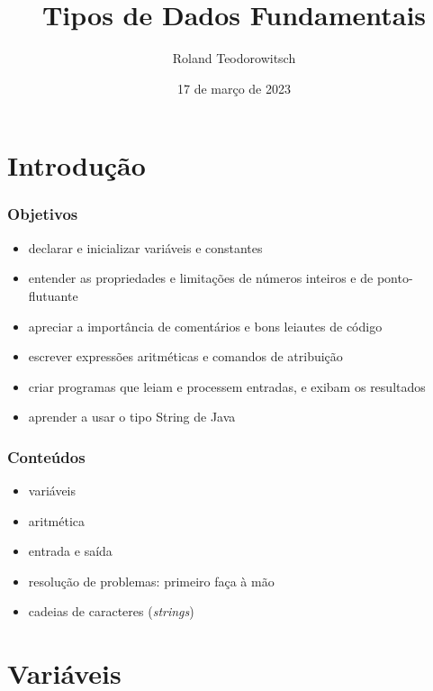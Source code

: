 \documentclass[xcolor={dvipsnames,table},aspectratio=169]{beamer}
\title[\sc{Tipos de Dados Fundamentais}]{Tipos de Dados Fundamentais}
\author[Roland Teodorowitsch]{Roland Teodorowitsch}
\institute[FPROG - EP - PUCRS]{Fundamentos de Programação - Escola Politécnica - PUCRS}
\date{17 de março de 2023}
\begin{document}
\justifying

\begin{frame}
	\titlepage
\end{frame}

\section{Introdução}

\begin{frame}\frametitle{Objetivos}
\begin{itemize}
	\item declarar e inicializar variáveis e constantes
	\item entender as propriedades e limitações de números inteiros e de ponto-flutuante
	\item apreciar a importância de comentários e bons leiautes de código
	\item escrever expressões aritméticas e comandos de atribuição
	\item criar programas que leiam e processem entradas, e exibam os resultados
	\item aprender a usar o tipo String de Java
\end{itemize}
\end{frame}

\begin{frame}\frametitle{Conteúdos}
\begin{itemize}
	\item variáveis
	\item aritmética
	\item entrada e saída
	\item resolução de problemas: primeiro faça à mão
	\item cadeias de caracteres (\emph{strings})
\end{itemize}
\end{frame}

\section{Variáveis}
\end{document}
